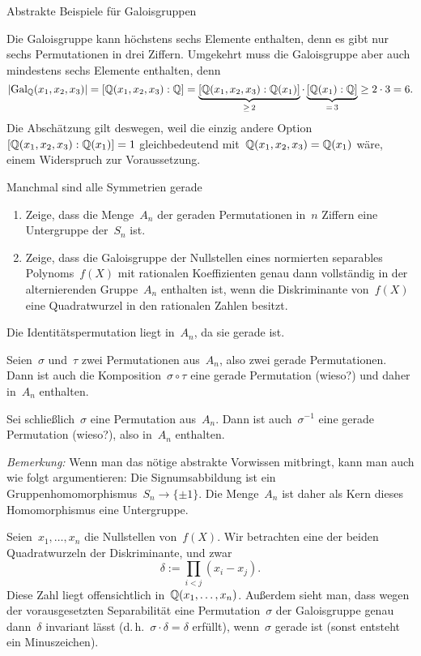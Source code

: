 \documentclass{algblatt}
\begin{document}
\begin{aufgabe}{Abstrakte Beispiele für Galoisgruppen}
\begin{loesungE}
\item Die Galoisgruppe kann höchstens sechs Elemente enthalten, denn es gibt
nur sechs Permutationen in drei Ziffern. Umgekehrt muss die Galoisgruppe aber
auch mindestens sechs Elemente enthalten, denn
\[ |\mathrm{Gal}_{\mathbb{Q}}(x_1,x_2,x_3)| = [\mathbb{Q}(x_1,x_2,x_3):\mathbb{Q}] =
  \underbrace{[\mathbb{Q}(x_1,x_2,x_3):\mathbb{Q}(x_1)]}_{\geq\,2} \cdot
  \underbrace{[\mathbb{Q}(x_1):\mathbb{Q}]}_{=\,3} \geq
  2 \cdot 3 = 6. \]
Die Abschätzung gilt deswegen, weil die einzig andere
Option~$[\mathbb{Q}(x_1,x_2,x_3):\mathbb{Q}(x_1)] = 1$ gleichbedeutend
mit~$\mathbb{Q}(x_1,x_2,x_3) = \mathbb{Q}(x_1)$ wäre, einem Widerspruch zur Voraussetzung.
\end{loesungE}
\end{aufgabe}

\begin{aufgabe}{Manchmal sind alle Symmetrien gerade}
\begin{enumerate}
\item Zeige, dass die Menge~$A_n$ der geraden Permutationen in~$n$ Ziffern eine
Untergruppe der~$S_n$ ist.

\item Zeige, dass die Galoisgruppe der Nullstellen eines normierten separables
Polynoms~$f(X)$ mit rationalen Koeffizienten genau dann vollständig in der
alternierenden Gruppe~$A_n$ enthalten ist, wenn die Diskriminante von~$f(X)$
eine Quadratwurzel in den rationalen Zahlen besitzt.
\end{enumerate}

\begin{loesungE}
\item Die Identitätspermutation liegt in~$A_n$, da sie gerade ist.

Seien~$\sigma$ und~$\tau$ zwei Permutationen aus~$A_n$, also zwei gerade
Permutationen. Dann ist auch die Komposition~$\sigma \circ \tau$ eine gerade
Permutation (wieso?) und daher in~$A_n$ enthalten.

Sei schließlich~$\sigma$ eine Permutation aus~$A_n$. Dann ist
auch~$\sigma^{-1}$ eine gerade Permutation (wieso?), also in~$A_n$ enthalten.

\emph{Bemerkung:} Wenn man das nötige abstrakte Vorwissen mitbringt, kann man
auch wie folgt argumentieren: Die Signumsabbildung ist ein
Gruppenhomomorphismus~$S_n \to \{ \pm1 \}$. Die Menge~$A_n$ ist daher als Kern
dieses Homomorphismus eine Untergruppe.

\item Seien~$x_1, \ldots, x_n$ die Nullstellen von~$f(X)$. Wir betrachten eine
der beiden Quadratwurzeln der Diskriminante, und zwar
\[ \delta := \prod_{i < j} (x_i - x_j). \]
Diese Zahl liegt offensichtlich in~$\mathbb{Q}(x_1,\ldots,x_n)$. Außerdem sieht man,
dass wegen der vorausgesetzten Separabilität eine Permutation~$\sigma$ der
Galoisgruppe genau dann~$\delta$ invariant lässt (d.\,h.~$\sigma \cdot \delta =
\delta$ erfüllt), wenn~$\sigma$ gerade ist (sonst entsteht ein Minuszeichen).


\end{loesungE}
\end{aufgabe}
\end{document}
